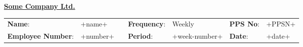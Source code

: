 \documentclass{article}
\begin{document}

\Huge{\underline{\textbf{Some Company Ltd.}}}

\begin{table}[h]
    \centering
    \begin{tabular}{lllllll}
        \textbf{Name}:              & +name+   &  & \textbf{Frequency}: & Weekly        & \textbf{PPS No}: & +PPSN+ \\
        \textbf{Employee Number}:   & +number+ &  & \textbf{Period}:    & +week-number+ & \textbf{Date}:   & +date+
    \end{tabular}
\end{table}

\vspace{-5mm}
\end{document}
